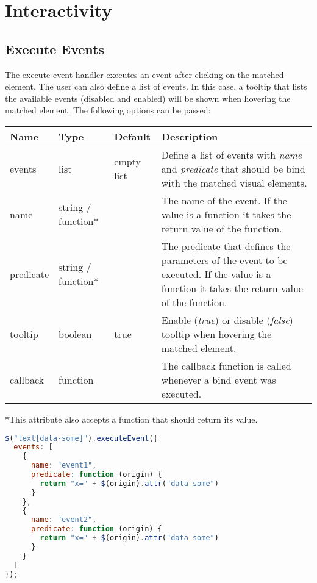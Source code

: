 \pagebreak

\section{Interactivity}
\label{sec:interactivity}

\subsection{Execute Events}
\label{sec:execute_events}

The execute event handler executes an event after clicking on the matched element.
The user can also define a list of events.
In this case, a tooltip that lists the available events (disabled and enabled) will be shown when hovering the matched element.
The following options can be passed:

\vspace{0.5cm}
\begin{tabular}{ l l l p{7cm} }
  \textbf{Name} & \textbf{Type} & \textbf{Default} & \textbf{Description} \\
  \hline\noalign{\medskip}
  events & list & empty list & Define a list of events with \textit{name} and \textit{predicate} that should be bind with the matched visual elements. \\
  \hline\noalign{\medskip}
  \hspace{0.5cm} name & string / function* & & The name of the event. If the value is a function it takes the return value of the function.\\
  \hline\noalign{\medskip}
  \hspace{0.5cm}  predicate & string / function* & & The predicate that defines the parameters of the event to be executed. If the value is a function it takes the return value of the function.\\
  \hline\noalign{\medskip}
  tooltip & boolean & true & Enable (\textit{true}) or disable (\textit{false}) tooltip when hovering the matched element.\\
  \hline\noalign{\medskip}
  callback & function &  & The callback function is called whenever a bind event was executed.
\end{tabular}

*This attribute also accepts a function that should return its value.

\begin{lstlisting}[float=ht!,language=JavaScript]
$("text[data-some]").executeEvent({
  events: [
    { 
      name: "event1", 
      predicate: function (origin) {
        return "x=" + $(origin).attr("data-some") 
      }
    },
    {
      name: "event2", 
      predicate: function (origin) {
        return "x=" + $(origin).attr("data-some")
      }
    } 
  ]
});
\end{lstlisting}
